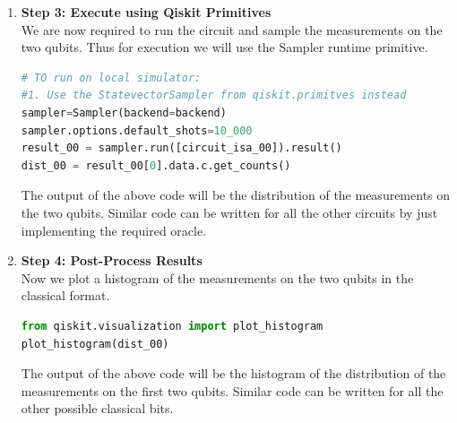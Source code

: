 \documentclass[12pt, oneside]{book}
\theoremstyle{definition}
\theoremstyle{definition}
\theoremstyle{remark}
\begin{document}
\begin{enumerate}
\begin{figure}[H]
        \label{fig:superdense_opt_circuit}
    \end{figure}
    The Optimized circuit shown in figure \ref{fig:superdense_opt_circuit} are the ones that actually get executed on a quantum computer as they are optimized for the target hardware.
    \item \textbf{Step 3: Execute using Qiskit Primitives}\\
    We are now required to run the circuit and sample the measurements on the two qubits. Thus for execution we will use the Sampler runtime primitive.
    \begin{lstlisting}[language=Python]
# TO run on local simulator:
#1. Use the StatevectorSampler from qiskit.primitves instead
sampler=Sampler(backend=backend)
sampler.options.default_shots=10_000
result_00 = sampler.run([circuit_isa_00]).result()
dist_00 = result_00[0].data.c.get_counts()  
    \end{lstlisting}
    The output of the above code will be the distribution of the measurements on the two qubits. Similar code can be written for all the other circuits by just implementing the required oracle.

    \item \textbf{Step 4: Post-Process Results}\\
    Now we plot a histogram of the measurements on the two qubits in the classical format.
    \begin{lstlisting}[language=Python]
from qiskit.visualization import plot_histogram
plot_histogram(dist_00)
    \end{lstlisting}
    The output of the above code will be the histogram of the distribution of the measurements on the first two qubits. Similar code can be written for all the other possible classical bits.


\end{enumerate}
\end{document}
